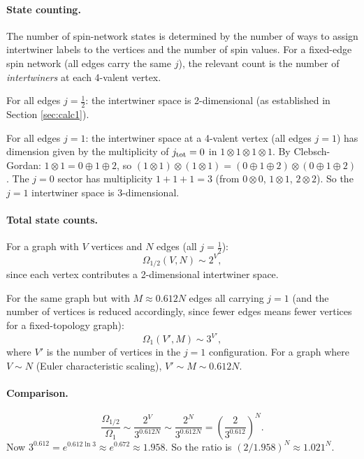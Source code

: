\documentclass[11pt,a4paper]{article}
\theoremstyle{definition}
\begin{document}
\paragraph{State counting.}
The number of spin-network states is determined by the number of ways to
assign intertwiner labels to the vertices and the number of spin values.
For a fixed-edge spin network (all edges carry the same $j$), the relevant
count is the number of \emph{intertwiners} at each 4-valent vertex.

For all edges $j=\tfrac{1}{2}$: the intertwiner space is 2-dimensional
(as established in Section \ref{sec:calc1}).

For all edges $j=1$: the intertwiner space at a 4-valent vertex
(all edges $j=1$) has dimension given by the multiplicity of $j_{\rm tot}=0$
in $1\otimes 1\otimes 1\otimes 1$.  By Clebsch-Gordan:
$1\otimes 1 = 0\oplus 1\oplus 2$, so
$(1\otimes 1)\otimes(1\otimes 1) = (0\oplus 1\oplus 2)\otimes(0\oplus 1\oplus 2)$.
The $j=0$ sector has multiplicity $1+1+1=3$ (from $0\otimes 0$, $1\otimes 1$,
$2\otimes 2$).  So the $j=1$ intertwiner space is 3-dimensional.

\paragraph{Total state counts.}
For a graph with $V$ vertices and $N$ edges (all $j=\tfrac{1}{2}$):
\begin{equation}
  \Omega_{1/2}(V,N) \sim 2^V,
\end{equation}
since each vertex contributes a 2-dimensional intertwiner space.

For the same graph but with $M\approx 0.612N$ edges all carrying $j=1$
(and the number of vertices is reduced accordingly, since fewer edges
means fewer vertices for a fixed-topology graph):
\begin{equation}
  \Omega_{1}(V',M) \sim 3^{V'},
\end{equation}
where $V'$ is the number of vertices in the $j=1$ configuration.
For a graph where $V\sim N$ (Euler characteristic scaling), $V'\sim M\sim 0.612N$.

\paragraph{Comparison.}
\begin{equation}\label{eqn:entropy-ratio}
  \frac{\Omega_{1/2}}{\Omega_{1}}
  \sim \frac{2^V}{3^{0.612N}}
  \sim \frac{2^N}{3^{0.612N}}
  = \left(\frac{2}{3^{0.612}}\right)^N.
\end{equation}
Now $3^{0.612} = e^{0.612\ln 3}\approx e^{0.672}\approx 1.958$.
So the ratio is $(2/1.958)^N \approx 1.021^N$.
\end{document}
